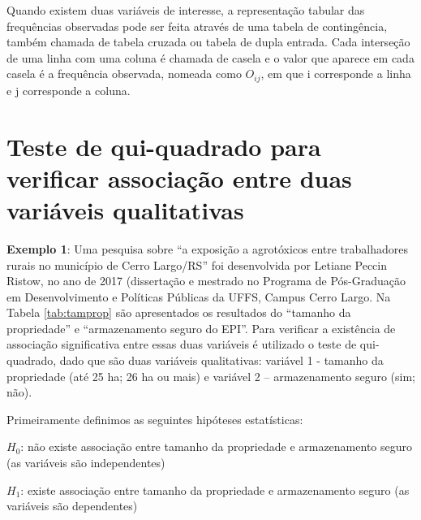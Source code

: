 \documentclass[12pt,brazil,oneside]{book}
\begin{document}
Quando existem duas variáveis de interesse, a representação tabular das frequências observadas pode ser feita através de uma tabela de contingência, também chamada de tabela cruzada ou tabela de dupla entrada. Cada interseção de uma linha com uma coluna é chamada de casela e o valor que aparece em cada casela é a frequência observada, nomeada como \(O_{ij}\), em que i corresponde a linha e j corresponde a coluna.

\hypertarget{teste-de-qui-quadrado-para-verificar-associacao-entre-duas-variaveis-qualitativas}{%
\section{Teste de qui-quadrado para verificar associação entre duas variáveis qualitativas}\label{teste-de-qui-quadrado-para-verificar-associacao-entre-duas-variaveis-qualitativas}}

\textbf{Exemplo 1}: Uma pesquisa sobre ``a exposição a agrotóxicos entre trabalhadores rurais no município de Cerro Largo/RS'' foi desenvolvida por Letiane Peccin Ristow, no ano de 2017 (dissertação e mestrado no Programa de Pós-Graduação em Desenvolvimento e Políticas Públicas da UFFS, Campus Cerro Largo. Na Tabela \ref{tab:tamprop} são apresentados os resultados do ``tamanho da propriedade'' e ``armazenamento seguro do EPI''. Para verificar a existência de associação significativa entre essas duas variáveis é utilizado o teste de qui-quadrado, dado que são duas variáveis qualitativas: variável 1 - tamanho da propriedade (até 25 ha; 26 ha ou mais) e variável 2 -- armazenamento seguro (sim; não).

Primeiramente definimos as seguintes hipóteses estatísticas:

\(H_0\): não existe associação entre tamanho da propriedade e armazenamento seguro (as variáveis são independentes)

\(H_1\): existe associação entre tamanho da propriedade e armazenamento seguro (as variáveis são dependentes)
\end{document}
